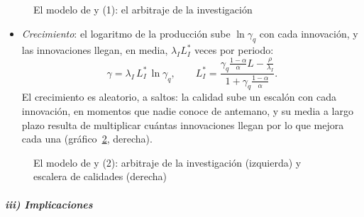 \documentclass[11pt]{article}
\begin{document}
\begin{figure}[H]
\centering
\caption{El modelo de  y  (1): el arbitraje de la investigación}\label{fig:aghion-howitt-1}
\end{figure}

\begin{itemize}
\item \emph{Crecimiento}: el logaritmo de la producción sube $\ln\gamma_q$ con cada innovación, y las innovaciones llegan, en media, $\lambda_IL_I^*$ veces por periodo:
  \begin{equation}
  \gamma=\lambda_I\,L_I^*\,\ln\gamma_q,\qquad L_I^*=\frac{\gamma_q\frac{1-\alpha}{\alpha}L-\frac{\rho}{\lambda_I}}{1+\gamma_q\frac{1-\alpha}{\alpha}}.\label{eq:ah-gamma}
  \end{equation}
  El crecimiento es aleatorio, a saltos: la calidad sube un escalón con cada innovación, en momentos que nadie conoce de antemano, y su media a largo plazo resulta de multiplicar cuántas innovaciones llegan por lo que mejora cada una (gráfico~\ref{fig:aghion-howitt}, derecha).
\end{itemize}

\begin{figure}[H]
\centering
\caption{El modelo de  y  (2): arbitraje de la investigación (izquierda) y escalera de calidades (derecha)}\label{fig:aghion-howitt}
\end{figure}

\subparagraph{iii) Implicaciones}
\end{document}
